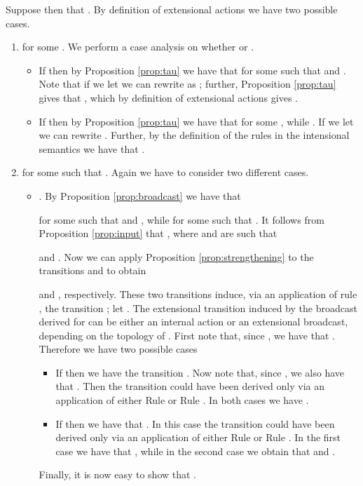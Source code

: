 \documentclass{LMCS}
\begin{document}
Suppose then that . 
By definition of extensional actions we have two possible cases.
\begin{enumerate}
\item  for some . 
We perform a case analysis on whether 
 or .
	\begin{itemize}
	\item If  then by Proposition \ref{prop:tau} we have that 
	 for some  such 
	that  and . Note that if we let  we can rewrite  as 
	; further, Proposition \ref{prop:tau} 
	gives that , which by definition of extensional 
	actions gives .
	\item If  then by Proposition \ref{prop:tau} we have that 
	 for some , while . 
	If we let  we can rewrite . 
	Further, by the definition of the rules in the intensional 
	semantics we have that .
	\end{itemize}
\item  for some  
such that . Again we have to consider two different cases. 
	\begin{itemize}
	\item . By Proposition \ref{prop:broadcast} we have that 
	 
	for some  such that  and , while 
	 for some 
	 such that . 
	It follows from Proposition \ref{prop:input} that 
	, where  and 
	 are such that 
	 
	and . Now we can apply Proposition \ref{prop:strengthening} 
	to the transitions 
	 and  to obtain 
	 
	and , respectively. 
	These two transitions induce, via an application of rule , the 
	transition ; 
	let . 
	The extensional transition induced by the broadcast derived for 
	 can be either an internal action or an extensional 
	broadcast, depending on the topology of . 
	First note that, since , we have that 
	. Therefore we have two possible cases
		\begin{itemize}
		\item If  then we have the 
		transition . 
		Now note that, since , we also have 
		that . 
		Then the transition  could have been derived 
		only via an application of either Rule  or Rule . 
		In both cases we have . 
		\item If  then we have 
		that . 
		In this case the transition  could have been derived 
		only via an application of either Rule  or 
		Rule . In the first case we have that 
		, while in the second case we obtain that 
		 and .	
		\end{itemize}
	Finally, it is now easy to show that .
	

\end{itemize}
\end{enumerate}
\end{document}
